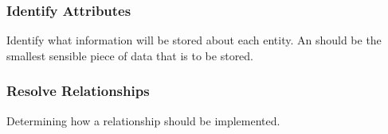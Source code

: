 \documentclass[\main/notes.tex]{subfiles}
\begin{document}
				\subsubsection{Identify Attributes}
					Identify what information will be stored about each entity. An  should be the smallest sensible piece of data that is to be stored.
				\subsubsection{Resolve Relationships}
					Determining how a relationship should be implemented.

	\vbox{}
\end{document}
